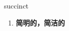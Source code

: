 
\begin{frame}
{\huge succinct}
\begin{center}
\begin{enumerate}\Large
  \item \textbf{简明的，简洁的}
\end{enumerate}
\end{center}
\end{frame}

